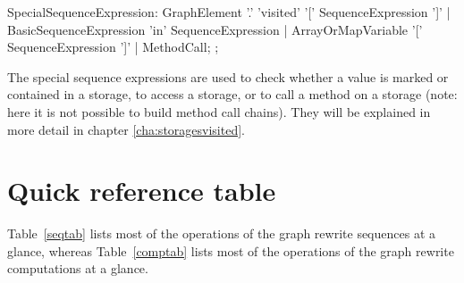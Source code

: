 \begin{rail}
  SpecialSequenceExpression:
    GraphElement '.' 'visited' '[' SequenceExpression ']' |
    BasicSequenceExpression 'in' SequenceExpression |
    ArrayOrMapVariable '[' SequenceExpression ']' |
    MethodCall;
  ;
\end{rail}

The special sequence expressions are used to check whether a value is marked or contained in a storage, to access a storage, or to call a method on a storage (note: here it is not possible to build method call chains). 
They will be explained in more detail in chapter \ref{cha:storagesvisited}.


\section{Quick reference table}

Table~\ref{seqtab} lists most of the operations of the graph rewrite sequences at a glance,
whereas Table~\ref{comptab} lists most of the operations of the graph rewrite computations at a glance.

